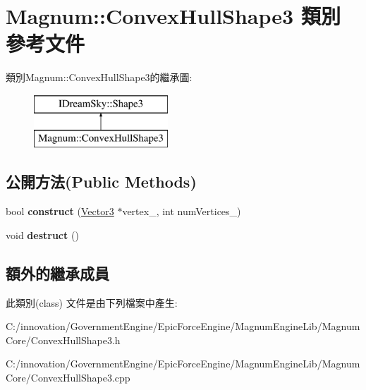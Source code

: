 \hypertarget{class_magnum_1_1_convex_hull_shape3}{}\section{Magnum\+:\+:Convex\+Hull\+Shape3 類別 參考文件}
\label{class_magnum_1_1_convex_hull_shape3}
類別\+Magnum\+:\+:Convex\+Hull\+Shape3的繼承圖\+:\begin{figure}[H]
\begin{center}
\leavevmode
\includegraphics[height=2.000000cm]{class_magnum_1_1_convex_hull_shape3}
\end{center}
\end{figure}
\subsection*{公開方法(Public Methods)}
\begin{DoxyCompactItemize}
\item 
bool {\bfseries construct} (\hyperlink{class_i_dream_sky_1_1_vector3}{Vector3} $\ast$vertex\+\_\+, int num\+Vertices\+\_\+)\hypertarget{class_magnum_1_1_convex_hull_shape3_aaecc70e571d683c3f08fffe43a99a873}{}\label{class_magnum_1_1_convex_hull_shape3_aaecc70e571d683c3f08fffe43a99a873}

\item 
void {\bfseries destruct} ()\hypertarget{class_magnum_1_1_convex_hull_shape3_afb7c859a2b04dbf78835855f86dcf59a}{}\label{class_magnum_1_1_convex_hull_shape3_afb7c859a2b04dbf78835855f86dcf59a}

\end{DoxyCompactItemize}
\subsection*{額外的繼承成員}


此類別(class) 文件是由下列檔案中產生\+:\begin{DoxyCompactItemize}
\item 
C\+:/innovation/\+Government\+Engine/\+Epic\+Force\+Engine/\+Magnum\+Engine\+Lib/\+Magnum\+Core/Convex\+Hull\+Shape3.\+h\item 
C\+:/innovation/\+Government\+Engine/\+Epic\+Force\+Engine/\+Magnum\+Engine\+Lib/\+Magnum\+Core/Convex\+Hull\+Shape3.\+cpp\end{DoxyCompactItemize}
